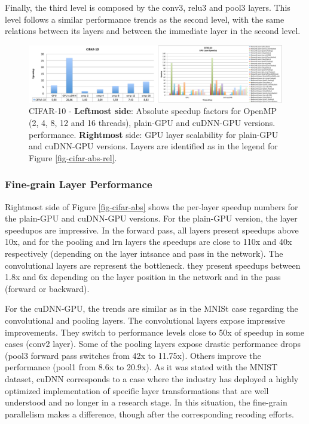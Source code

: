 Finally, the third level is composed by the conv3, relu3 and pool3 
layers. This level follows a similar performance trends as the second 
level, with the same relations between its layers and between the 
immediate layer in the second level.

\begin{figure}[]
\includegraphics[width=\textwidth]{figures/cifar-abs-perf+gpu-layer.pdf}
\caption{CIFAR-10 - \textbf{Leftmost side}: Absolute speedup factors for OpenMP (2, 4, 8, 12 and 16 threads), plain-GPU and cuDNN-GPU versions. performance. \textbf{Rightmost} side: GPU layer scalability for plain-GPU and cuDNN-GPU versions. Layers are identified as in the legend for Figure \ref{fig-cifar-abs-rel}.}
\end{figure}

\subsubsection{Fine-grain Layer Performance}
Rightmost side of Figure \ref{fig-cifar-abs} shows the per-layer
speedup numbers for the plain-GPU and cuDNN-GPU versions.
For the plain-GPU version, the layer speedupos are impressive. 
In the forward pass, all layers present speedups above 10x, and for 
the pooling and lrn layers the speedups are close to 110x and 40x 
respectively (depending on the layer intsance and pass in the network). 
The convolutional layers are represent the bottleneck. they present 
speedups between 1.8x and 6x depending on the layer position in the 
network and in the pass (forward or backward).

For the cuDNN-GPU, the trends are similar as in the MNISt case 
regarding the convolutional and pooling layers. The convolutional 
layers expose impressive improvements. They switch to performance 
levels close to 50x of speedup in some cases (conv2 layer).
Some of the pooling layers expose drastic performance drops (pool3 
forward pass switches from 42x to 11.75x). Others improve the 
performance (pool1 from 8.6x to 20.9x). 
As it was stated with the MNIST dataset, cuDNN corresponds to a case 
where the industry has deployed a highly optimized implementation of 
specific layer transformations that are well understood and no longer 
in a research stage. In this situation, the fine-grain parallelism makes 
a difference, though after the corresponding recoding efforts.

